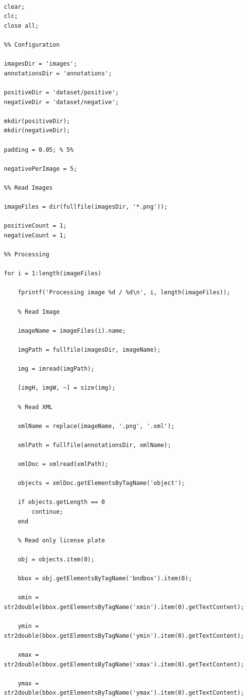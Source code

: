 \begin{verbatim}

clear;
clc;
close all;

%% Configuration

imagesDir = 'images';
annotationsDir = 'annotations';

positiveDir = 'dataset/positive';
negativeDir = 'dataset/negative';

mkdir(positiveDir);
mkdir(negativeDir);

padding = 0.05; % 5%

negativePerImage = 5;

%% Read Images

imageFiles = dir(fullfile(imagesDir, '*.png'));

positiveCount = 1;
negativeCount = 1;

%% Processing

for i = 1:length(imageFiles)

    fprintf('Processing image %d / %d\n', i, length(imageFiles));

    % Read Image

    imageName = imageFiles(i).name;

    imgPath = fullfile(imagesDir, imageName);

    img = imread(imgPath);

    [imgH, imgW, ~] = size(img);

    % Read XML

    xmlName = replace(imageName, '.png', '.xml');

    xmlPath = fullfile(annotationsDir, xmlName);

    xmlDoc = xmlread(xmlPath);

    objects = xmlDoc.getElementsByTagName('object');

    if objects.getLength == 0
        continue;
    end

    % Read only license plate

    obj = objects.item(0);

    bbox = obj.getElementsByTagName('bndbox').item(0);

    xmin = str2double(bbox.getElementsByTagName('xmin').item(0).getTextContent);

    ymin = str2double(bbox.getElementsByTagName('ymin').item(0).getTextContent);

    xmax = str2double(bbox.getElementsByTagName('xmax').item(0).getTextContent);

    ymax = str2double(bbox.getElementsByTagName('ymax').item(0).getTextContent);


\end{verbatim}
